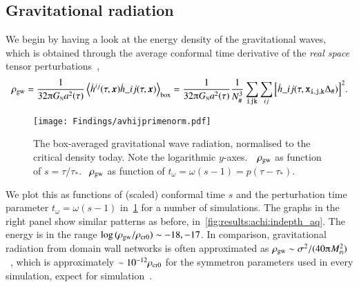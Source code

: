 \subsection{Gravitational radiation}\label{sec:results:h11:rho_gw}
    We begin by having a look at the energy density of the gravitational waves, which is obtained through the average conformal time derivative of the \emph{real space} tensor perturbations~\citep{kawasakiStudyGravitationalRadiation2011},
    \begin{equation}\label{eq:results:h11:rho_gw}
        \rho\ped{gw} = \frac{1}{32\ppi G\nped{N}a^2(\tau)} \left\langle \dot{h}\^{ij}(\tau, \vec{x})\dot{h}\_{ij}(\tau, \vec{x}) \right\rangle_{\mathrm{box}} =  \frac{1}{32\ppi G\nped{N}a^2(\tau)} \frac{1}{N_\#^3} \sum_{\lcoord{i}\lcoord{j}\lcoord{k}} \sum_{ij} \bclosed{\dot{h}\_{ij}(\tau,\lcoord{x}_{\lcoord{i}, \lcoord{j}, \lcoord{k}} \Delta_\# )}^2.
    \end{equation}
    \begin{figure}[ht]
        \centering
        \texttt{[image: Findings/avhijprimenorm.pdf]}
        \caption{The box-averaged gravitational wave radiation, normalised to the critical density today. Note the logarithmic $y$-axes.~~$\rho_\mathrm{gw}$ as function of $s=\tau/\tau_\ast$. ~$\rho_\mathrm{gw}$ as function of $t_\omega = \omega(s-1)= p(\tau-\tau_\ast)$.}
        \label{fig:results:h11:avhijprimenorm}
    \end{figure}
    We plot this as functions of (scaled) conformal time $s$ and the perturbation time parameter $t_\omega = \omega(s-1)$ in~\cref{fig:results:h11:avhijprimenorm} for a number of simulations. %
    The graphs in the right panel show similar patterns as before, in~\cref{fig:results:achi:indepth_aq}. %
    The energy is in the range $\log{(\rho\ensuremath{_\mathrm{gw}}/\rho\ensuremath{_\mathrm{cr0}})}\sim-18, -17$. In comparison, gravitational radiation from domain wall networks is often approximated as $\rho\ped{gw}\sim \sigma^2 /(40\ppi M\nped{Pl}^2)$~\citep{ramazanovFreezeinDarkMatter2022}, which is approximately $ \sim 10^{-12}\rho_\mathrm{cr0}$ for the symmetron parameters used in every simulation, expect for simulation~.
    
    


